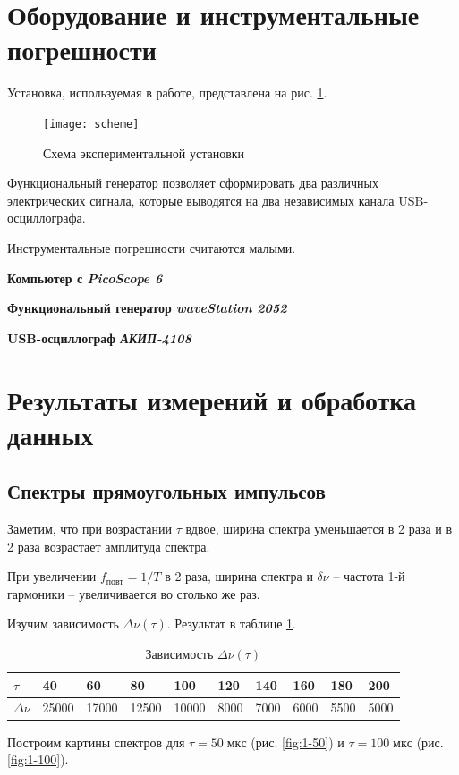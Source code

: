 \documentclass[a4paper]{article}
\newcommand{\equip}[1]{{\bf #1}

}
\begin{document}
\section{Оборудование и инструментальные погрешности}

Установка, используемая в работе, представлена на рис. \ref{fig:scheme}.
\begin{figure}
	\centering
	\texttt{[image: scheme]}
	\caption{Схема экспериментальной установки}
	\label{fig:scheme}
\end{figure}
Функциональный генератор позволяет сформировать два различных электрических сигнала, которые выводятся на два независимых канала USB-осциллографа.

Инструментальные погрешности считаются малыми.

\equip{Компьютер  с \emph{PicoScope 6}}
\equip{Функциональный генератор \emph{waveStation 2052}}
\equip{USB-осциллограф \emph{АКИП-4108}}

\section{Результаты измерений и обработка данных}

\subsection{Спектры прямоугольных импульсов}

Заметим, что при возрастании $ \tau $ вдвое, ширина спектра уменьшается в 2 раза и в 2 раза возрастает амплитуда спектра.

При увеличении $ f_{повт} = 1/T $ в 2 раза, ширина спектра и $ \delta \nu $ -- частота 1-й гармоники --  увеличивается во столько же раз. 

Изучим зависимость $ \Delta \nu (\tau) $. Результат в таблице \ref{tab:nu-tau}.

\begin{table}[h]
	\centering
	\begin{tabular}{|l|l|l|l|l|l|l|l|l|l|}
		\hline
		${\tau}$      & 40    & 60    & 80    & 100   & 120  & 140  & 160  & 180  & 200  \\ \hline
		${\Delta \nu}$ & 25000 & 17000 & 12500 & 10000 & 8000 & 7000 & 6000 & 5500 & 5000 \\ \hline
	\end{tabular}
	\caption{Зависимость $\Delta \nu (\tau)$}
	\label{tab:nu-tau}
\end{table}

Построим картины спектров для $ \tau  =  50\; мкс $ (рис. \ref{fig:1-50}) и $ \tau = 100\; мкс $ (рис. \ref{fig:1-100}).
\end{document}
